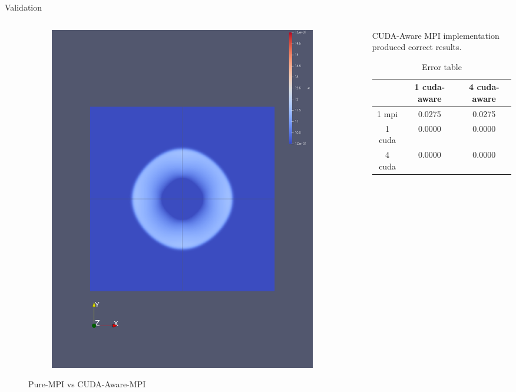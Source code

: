 \documentclass[
  english,            %
  aspectratio=169,    %
  11pt
]{tumbeamer}
\begin{document}
\begin{frame}{Validation}
\begin{columns}
\begin{column}{.45\textwidth}
\begin{figure}[htpb]
\begin{subfigure}{.48\textwidth}
				\includegraphics[width=\textwidth,keepaspectratio=true]{figs/1_validation_cuda_aware_4mpi.png}
				\label{fig:4mpi-cuda-aware}
			\end{subfigure}
			\caption{Pure-MPI vs CUDA-Aware-MPI}
			\label{figs:validation_cuda_aware}
		\end{figure}
	\end{column}
	\begin{column}{.4\textwidth}
		CUDA-Aware MPI implementation produced correct results.
		\begin{table}[h!]
			\centering
			\begin{tabular}{ |c|c|c|}
				\hline
				& 1 cuda-aware& 4 cuda-aware \\
				\hline
				1 mpi & 0.0275     & 0.0275 \\
				\hline
				1 cuda& 0.0000     &  0.0000 \\
				\hline
				4 cuda& 0.0000     & 0.0000 \\
				\hline
			\end{tabular}
			\caption{Error table}
			\label{table:cuda_aware}
		\end{table}  
	\end{column}
\end{columns}

\end{frame}
\end{document}
